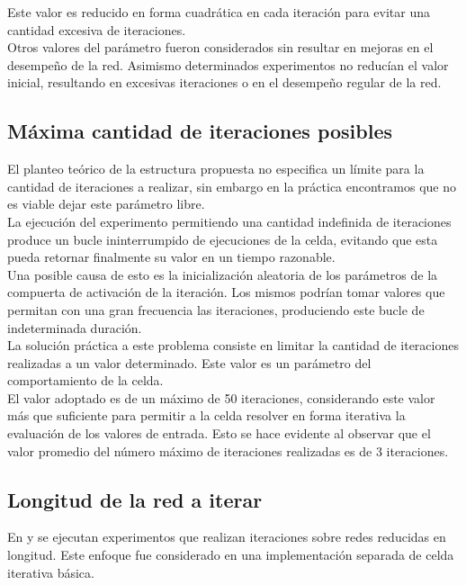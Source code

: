 \documentclass{article}
\begin{document}
Este valor es reducido en forma cuadrática en cada iteración para evitar una cantidad excesiva de iteraciones.\\

Otros valores del parámetro fueron considerados sin resultar en mejoras en el desempeño de la red. Asimismo determinados experimentos no reducían el valor inicial, resultando en excesivas iteraciones o en el desempeño regular de la red.

\subsection{Máxima cantidad de iteraciones posibles}

El planteo teórico de la estructura propuesta no especifica un límite para la cantidad de iteraciones a realizar, sin embargo en la práctica encontramos que no es viable dejar este parámetro libre.\\

La ejecución del experimento permitiendo una cantidad indefinida de iteraciones produce un bucle ininterrumpido de ejecuciones de la celda, evitando que esta pueda retornar finalmente su valor en un tiempo razonable.\\

Una posible causa de esto es la inicialización aleatoria de los parámetros de la compuerta de activación de la iteración. Los mismos podrían tomar valores que permitan con una gran frecuencia las iteraciones, produciendo este bucle de indeterminada duración.\\

La solución práctica a este problema consiste en limitar la cantidad de iteraciones realizadas a un valor determinado. Este valor es un parámetro del comportamiento de la celda.\\

El valor adoptado es de un máximo de 50 iteraciones, considerando este valor más que suficiente para permitir a la celda resolver en forma iterativa la evaluación de los valores de entrada. Esto se hace evidente al observar que el valor promedio del número máximo de iteraciones realizadas es de 3 iteraciones.\\

\subsection{Longitud de la red a iterar}
En \cite{loopyRNN} y \cite{bringingTheGaps} se ejecutan experimentos que realizan iteraciones sobre redes reducidas en longitud. Este enfoque fue considerado en una implementación separada de celda iterativa básica.\\
\end{document}
